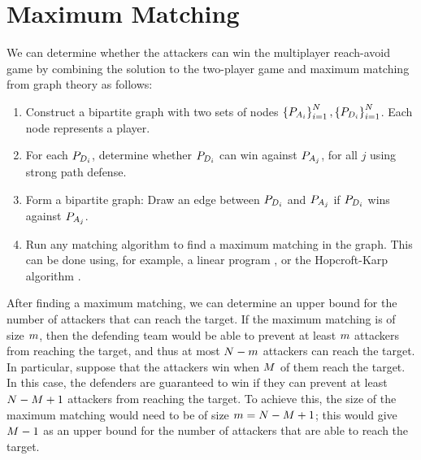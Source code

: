 \section{Maximum Matching}
\label{sec:max_match}
We can determine whether the attackers can win the multiplayer reach-avoid game by combining the solution to the two-player game and maximum matching \cite{Schrjiver2004, Karpinski1998} from graph theory as follows:

\begin{enumerate}
\item Construct a bipartite graph with two sets of nodes $\left\{P_{A_{i}}\right\}_{i=1}^N,\left\{P_{D_{i}}\right\}_{i=1}^N$. Each node represents a player.
\item For each $P_{D_{i}}$, determine whether $P_{D_{i}}$ can win against $P_{A_{j}}$, for all $j$ using strong path defense. 
\item Form a bipartite graph: Draw an edge between $P_{D_{i}}$ and $P_{A_{j}}$ if $P_{D_{i}}$ wins against $P_{A_{j}}$.
\item Run any matching algorithm to find a maximum matching in the graph. This can be done using, for example, a linear program \cite{Schrjiver2004}, or the Hopcroft-Karp algorithm \cite{Karpinski1998}.
\end{enumerate}

After finding a maximum matching, we can determine an upper bound for the number of attackers that can reach the target. If the maximum matching is of size $m$, then the defending team would be able to prevent at least $m$ attackers from reaching the target, and thus at most $N-m$ attackers can reach the target. In particular, suppose that the attackers win when $M$ of them reach the target. In this case, the defenders are guaranteed to win if they can prevent at least $N-M+1$ attackers from reaching the target. To achieve this, the size of the maximum matching would need to be of size $m = N-M+1$; this would give $M-1$ as an upper bound for the number of attackers that are able to reach the target.
